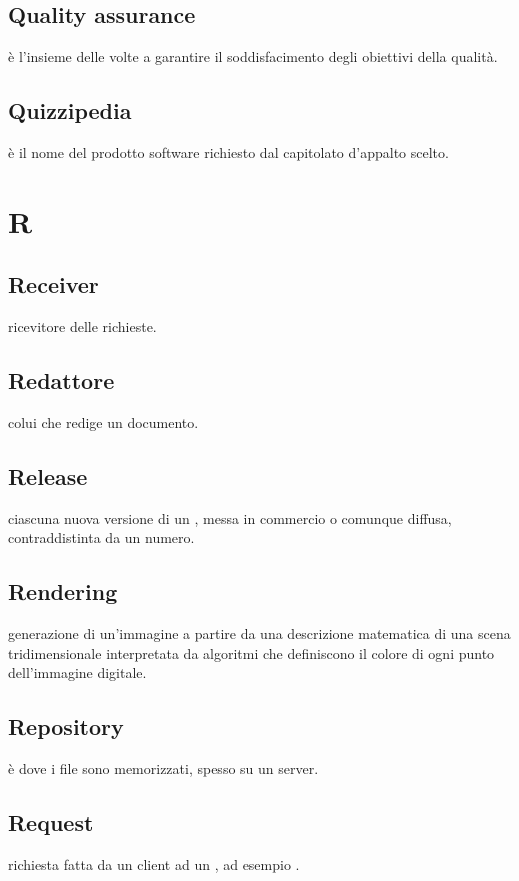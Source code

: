 \documentclass[12pt,a4paper]{article}
\begin{document}
\subsection{Quality assurance} 
 è l'insieme delle  volte a garantire il soddisfacimento degli obiettivi della qualità.

\subsection{Quizzipedia} 
 è il nome del prodotto software richiesto dal capitolato d'appalto scelto.


\newpage

\section{R}


	
\subsection{Receiver} 
ricevitore delle richieste.	
	
\subsection{Redattore} 
colui che redige un documento.

\subsection{Release} 
ciascuna nuova versione di un , messa in commercio o comunque diffusa, contraddistinta da un numero.

\subsection{Rendering} 
generazione di un'immagine a partire da una descrizione matematica di una scena tridimensionale interpretata da algoritmi che definiscono il colore di ogni punto dell'immagine digitale.

\subsection{Repository} 
è dove i file sono memorizzati, spesso su un server.

\subsection{Request} 
richiesta fatta da un client ad un , ad esempio .
\end{document}
